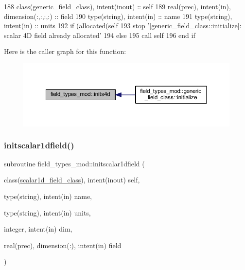 \begin{DoxyCode}
188     \textcolor{keywordtype}{class}(generic\_field\_class), \textcolor{keywordtype}{intent(inout)} :: self
189     \textcolor{keywordtype}{real(prec)}, \textcolor{keywordtype}{intent(in)}, \textcolor{keywordtype}{dimension(:,:,:,:)} :: field
190     \textcolor{keywordtype}{type}(string), \textcolor{keywordtype}{intent(in)} :: name
191     \textcolor{keywordtype}{type}(string), \textcolor{keywordtype}{intent(in)} :: units
192     \textcolor{keywordflow}{if} (\textcolor{keyword}{allocated}(self%
193         stop \textcolor{stringliteral}{'[generic\_field\_class::initialize]: scalar 4D field already allocated'}
194     \textcolor{keywordflow}{else}
195         \textcolor{keyword}{call }self%
196 \textcolor{keywordflow}{    end if}
\end{DoxyCode}
Here is the caller graph for this function\+:
\nopagebreak
\begin{figure}[H]
\begin{center}
\leavevmode
\includegraphics[width=350pt]{namespacefield__types__mod_a0499b29bbd4e4628fe73678cf554d918_icgraph}
\end{center}
\end{figure}
\mbox{\label{namespacefield__types__mod_a40667ebd7c9f62482c267e794a14eff4}} 
\subsubsection{\texorpdfstring{initscalar1dfield()}{initscalar1dfield()}}
{\footnotesize\ttfamily subroutine field\+\_\+types\+\_\+mod\+::initscalar1dfield (\begin{DoxyParamCaption}\item[{class(\mbox{\hyperlink{structfield__types__mod_1_1scalar1d__field__class}{scalar1d\+\_\+field\+\_\+class}}), intent(inout)}]{self,  }\item[{type(string), intent(in)}]{name,  }\item[{type(string), intent(in)}]{units,  }\item[{integer, intent(in)}]{dim,  }\item[{real(prec), dimension(\+:), intent(in)}]{field }\end{DoxyParamCaption})\hspace{0.3cm}{\ttfamily [private]}}



